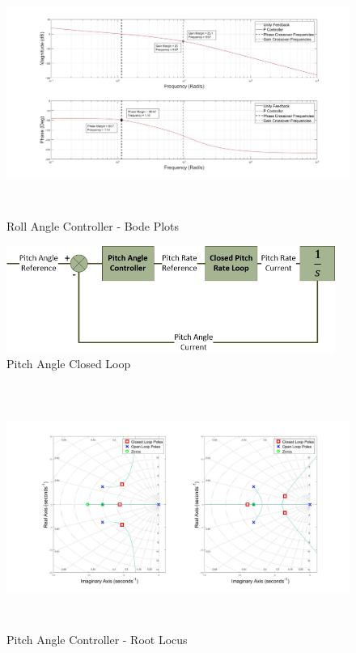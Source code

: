 \documentclass[12pt]{report}
\begin{document}
\begin{figure}[H]
	\centering
	\includegraphics[height = 8cm]{../Design/Matlab/Controllers/roll_angle_bode.jpg}
	\caption{Roll Angle Controller -  Bode Plots}
	\label{IM_RollAngleControlBode}
\end{figure}


\begin{figure}[H]
	\centering
	\includegraphics[height = 3.5cm]{../References/Diagrams/PitchAngleLoop.jpg}
	\caption{Pitch Angle Closed Loop}
	\label{IM_PitchAngleLoop}
\end{figure}

\begin{figure}[H]
	\centering
	\includegraphics[height = 8cm]{../Design/Matlab/Controllers/pitch_angle_root.jpg}
	\caption{Pitch Angle Controller -  Root Locus}
	\label{IM_PitchAngleControlRoot}
\end{figure}
\end{document}
